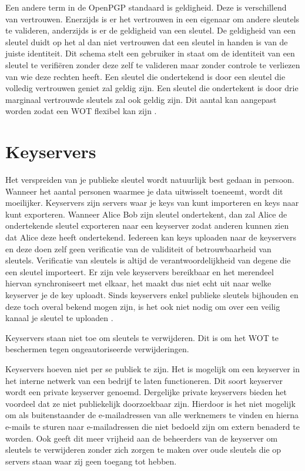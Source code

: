 Een andere term in de \gls{OpenPGP} standaard is geldigheid. Deze is verschillend van
vertrouwen. Enerzijds is er het vertrouwen in een eigenaar om andere sleutels te
valideren, anderzijds is er de geldigheid van een sleutel. De geldigheid van een
sleutel duidt op het al dan niet vertrouwen dat een sleutel in handen is van de
juiste identiteit.
Dit schema stelt een gebruiker in staat om de identiteit van een sleutel te
verifiëren zonder deze zelf te valideren maar zonder controle te verliezen van
wie deze rechten heeft. Een sleutel die ondertekend is door een sleutel die
volledig vertrouwen geniet zal geldig zijn. Een sleutel die ondertekent is door
drie marginaal vertrouwde sleutels zal ook geldig zijn. Dit aantal kan aangepast
worden zodat een \acrshort{WOT} flexibel kan zijn \autocite{GNUManualValidatingKeys}.

\section{Keyservers}
\label{sec:keyservers}

Het verspreiden van je publieke sleutel wordt natuurlijk best gedaan in persoon.
Wanneer het aantal personen waarmee je data uitwisselt toeneemt, wordt dit
moeilijker. Keyservers zijn servers waar je keys van kunt importeren en keys
naar kunt exporteren. Wanneer Alice Bob zijn sleutel ondertekent, dan zal Alice
de ondertekende sleutel exporteren naar een keyserver zodat anderen kunnen zien
dat Alice deze heeft ondertekend. Iedereen kan keys uploaden naar de keyservers
en deze doen zelf geen verificatie van de validiteit of betrouwbaarheid van
sleutels. Verificatie van sleutels is altijd de verantwoordelijkheid van degene
die een sleutel importeert. Er zijn vele keyservers bereikbaar en het merendeel
hiervan synchroniseert met elkaar, het maakt dus niet echt uit naar welke
keyserver je de key uploadt. Sinds keyservers enkel publieke sleutels bijhouden
en deze toch overal bekend mogen zijn, is het ook niet nodig om over een veilig
kanaal je sleutel te uploaden \autocite{GNUManualDistributingKeys}.

Keyservers staan niet toe om sleutels te verwijderen. Dit is om het
\acrshort{WOT} te
beschermen tegen ongeautoriseerde verwijderingen.

Keyservers hoeven niet per se publiek te zijn. Het is mogelijk om een keyserver
in het interne netwerk van een bedrijf te laten functioneren. Dit soort
keyserver wordt een private keyserver genoemd. Dergelijke private keyservers
bieden het voordeel dat ze niet publiekelijk doorzoekbaar zijn. Hierdoor is het
niet mogelijk om als buitenstaander de e-mailadressen van alle werknemers te
vinden en hierna e-mails te sturen naar e-mailadressen die niet bedoeld zijn om
extern benaderd te worden. Ook geeft dit meer vrijheid aan de beheerders van de
keyserver om sleutels te verwijderen zonder zich zorgen te maken over oude
sleutels die op servers staan waar zij geen toegang tot hebben.


